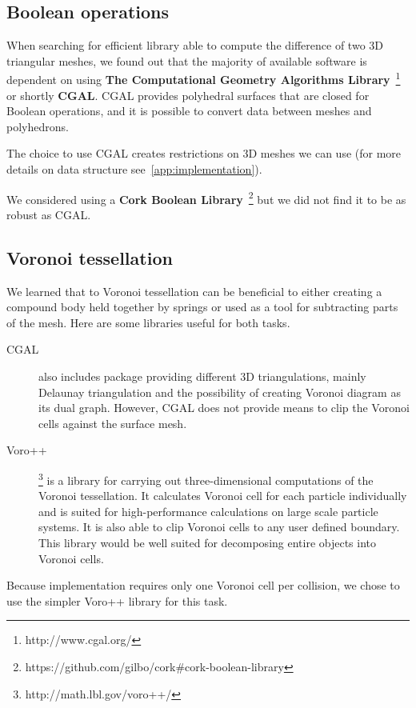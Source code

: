 \subsection{Boolean operations}
When searching for efficient library able to compute the difference of two 3D triangular meshes, we found out that the majority of available software  is dependent on using \textbf{The Computational Geometry Algorithms Library}~\footnote{http://www.cgal.org/} or shortly \textbf{CGAL}. CGAL provides polyhedral surfaces that are closed for Boolean operations, and it is possible to convert data between meshes and polyhedrons. 


The choice to use CGAL creates restrictions on 3D meshes we can use (for more details on data structure see~\cref{app:implementation}). 


We considered using a \textbf{Cork Boolean Library}~\footnote{https://github.com/gilbo/cork\#cork-boolean-library} but we did not find it to be as robust as CGAL. 

\subsection{Voronoi tessellation}
We learned that to Voronoi tessellation can be beneficial to either creating a compound body held together by springs or used as a tool for subtracting parts of the mesh. Here are some libraries useful for both tasks.

\begin{description}
\item[CGAL] also includes package providing different 3D triangulations, mainly Delaunay triangulation and the possibility of creating Voronoi diagram as its dual graph. However, CGAL does not provide means to clip the Voronoi cells against the surface mesh.

\item[Voro++]\footnote{http://math.lbl.gov/voro++/} is a library for carrying out three-dimensional computations of the Voronoi tessellation. It calculates Voronoi cell for each particle individually and is suited for high-performance calculations on large scale particle systems. It is also able to clip Voronoi cells to any user defined boundary. This library would be well suited for decomposing entire objects into Voronoi cells. 

\end{description}
Because implementation requires only one Voronoi cell per collision, we chose to use the simpler Voro++ library for this task. 


